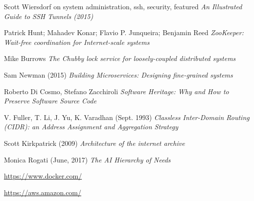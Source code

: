 \begin{thebibliography}{9}
Scott Wiersdorf on system administration, ssh, security, featured
\textit{An Illustrated Guide to SSH Tunnels (2015)}

Patrick Hunt; Mahadev Konar; Flavio P. Junqueira; Benjamin Reed
\textit{ZooKeeper: Wait-free coordination for Internet-scale systems}

Mike Burrows
\textit{The Chubby lock service for loosely-coupled distributed systems}

Sam Newman (2015)
\textit{Building Microservices: Designing fine-grained systems}

Roberto Di Cosmo, Stefano Zacchiroli
\textit{Software Heritage: Why and How to Preserve Software Source Code}

  V. Fuller, T. Li, J. Yu, K. Varadhan (Sept. 1993)
  \textit{Classless Inter-Domain Routing (CIDR): an Address Assignment and Aggregation Strategy}

  Scott Kirkpatrick (2009)
  \textit{Architecture of the internet archive}

  Monica Rogati (June, 2017)
  \textit{The AI Hierarchy of Needs}

\url{https://www.docker.com/}

\url{https://aws.amazon.com/}

\end{thebibliography}